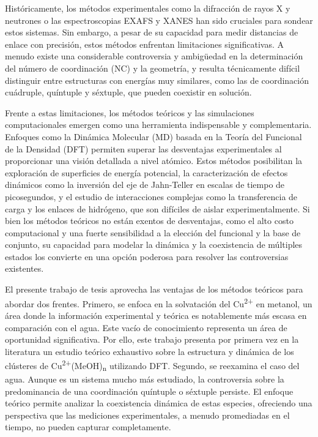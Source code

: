 Históricamente, los métodos experimentales como la difracción de rayos X y neutrones o las espectroscopias EXAFS y XANES han sido cruciales para sondear estos sistemas. Sin embargo, a pesar de su capacidad para medir distancias de enlace con precisión, estos métodos enfrentan limitaciones significativas. A menudo existe una considerable controversia y ambigüedad en la determinación del número de coordinación (NC) y la geometría, y resulta técnicamente difícil distinguir entre estructuras con energías muy similares, como las de coordinación cuádruple, quíntuple y séxtuple, que pueden coexistir en solución.

Frente a estas limitaciones, los métodos teóricos y las simulaciones computacionales emergen como una herramienta indispensable y complementaria. Enfoques como la Dinámica Molecular (MD) basada en la Teoría del Funcional de la Densidad (DFT) permiten superar las desventajas experimentales al proporcionar una visión detallada a nivel atómico. Estos métodos posibilitan la exploración de superficies de energía potencial, la caracterización de efectos dinámicos como la inversión del eje de Jahn-Teller en escalas de tiempo de picosegundos, y el estudio de interacciones complejas como la transferencia de carga y los enlaces de hidrógeno, que son difíciles de aislar experimentalmente. Si bien los métodos teóricos no están exentos de desventajas, como el alto costo computacional y una fuerte sensibilidad a la elección del funcional y la base de conjunto, su capacidad para modelar la dinámica y la coexistencia de múltiples estados los convierte en una opción poderosa para resolver las controversias existentes.

El presente trabajo de tesis aprovecha las ventajas de los métodos teóricos para abordar dos frentes. Primero, se enfoca en la solvatación del Cu\textsuperscript{2+} en metanol, un área donde la información experimental y teórica es notablemente más escasa en comparación con el agua. Este vacío de conocimiento representa un área de oportunidad significativa. Por ello, este trabajo presenta por primera vez en la literatura un estudio teórico exhaustivo sobre la estructura y dinámica de los clústeres de Cu\textsuperscript{2+}(MeOH)\textsubscript{n} utilizando DFT. Segundo, se reexamina el caso del agua. Aunque es un sistema mucho más estudiado, la controversia sobre la predominancia de una coordinación quíntuple o séxtuple persiste. El enfoque teórico permite analizar la coexistencia dinámica de estas especies, ofreciendo una perspectiva que las mediciones experimentales, a menudo promediadas en el tiempo, no pueden capturar completamente.

